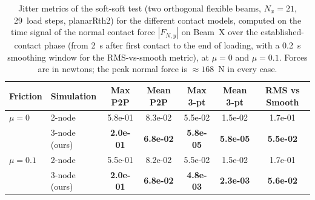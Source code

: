 \begin{table}[ht]
    \centering
    \small
    \caption{Jitter metrics of the soft-soft test (two orthogonal flexible beams, $N_x = 21$, 29~load steps, planarRth2) for the different contact models, computed on the time signal of the normal contact force $|F_{N,y}|$ on Beam~X over the established-contact phase (from 2~s after first contact to the end of loading, with a 0.2~s smoothing window for the RMS-vs-smooth metric), at $\mu = 0$ and $\mu = 0.1$. Forces are in newtons; the peak normal force is $\approx 168$~N in every case.}
    \label{tab:metrics_jitter_soft_soft}
    \begin{tabular}{llccccc}
        \toprule
        Friction & Simulation & Max P2P & Mean P2P & Max 3-pt & Mean 3-pt & RMS vs Smooth \\
        \midrule
        $\mu = 0$ & 2-node & 5.8e-01 & 8.3e-02 & 5.5e-02 & 1.5e-02 & 1.7e-01 \\
         & 3-node (ours) & \textbf{2.0e-01} & \textbf{6.8e-02} & \textbf{5.8e-05} & \textbf{5.8e-05} & \textbf{5.5e-02} \\
        \midrule
        $\mu = 0.1$ & 2-node & 5.5e-01 & 8.2e-02 & 5.5e-02 & 1.5e-02 & 1.7e-01 \\
         & 3-node (ours) & \textbf{2.0e-01} & \textbf{6.8e-02} & \textbf{4.8e-03} & \textbf{2.3e-03} & \textbf{5.6e-02} \\
        \bottomrule
    \end{tabular}
\end{table}
